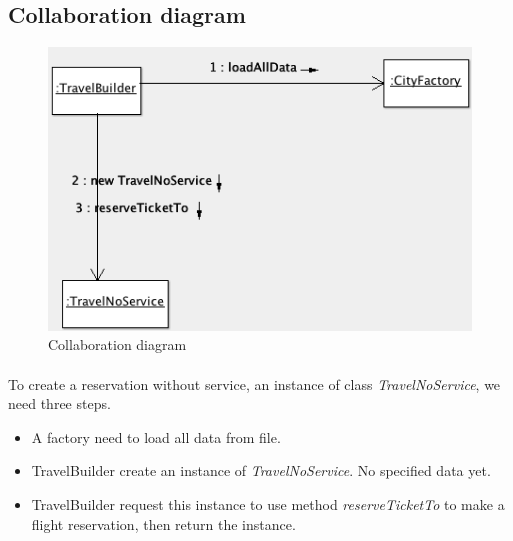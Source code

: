 \subsection{Collaboration diagram}

\begin{figure}[h]
\centering
\includegraphics[width=12cm]{project/images/collaboration.png}
\caption{Collaboration diagram}
\end{figure}

\paragraph{}
To create a reservation without service, an instance of class \textit{TravelNoService}, we need three steps. 

\begin{itemize}
\item A factory need to load all data from file.
\item TravelBuilder create an instance of \textit{TravelNoService}. No specified data yet.
\item TravelBuilder request this instance to use method \textit{reserveTicketTo} to make a flight reservation, then return the instance.
\end{itemize}